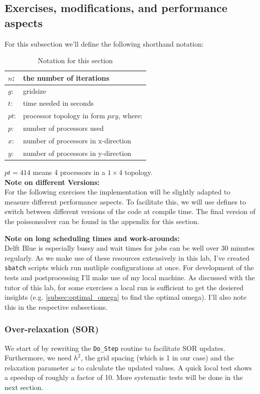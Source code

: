 \subsection{Exercises, modifications, and performance aspects}
For this subsection we'll define the following shorthand notation: \\
\begin{table}[h!]
    \centering
    \begin{tabular}{|l|l|}
        \hline
        $n$:  &the number of iterations\\\hline
        $g$:  &gridsize\\\hline
        $t$:  &time needed in seconds\\\hline
        $pt$: & processor topology in form $pxy$, where:\\
        $p$:  &number of processors used\\
        $x$:  &number of processors in x-direction\\
        $y$:  &number of processors in y-direction\\\hline
       \end{tabular}
    \caption{Notation for this section}
\end{table}
$pt = 414$ means 4 processors in a $1\times 4$ topology. \\

\textbf{Note on different Versions:}\\
For the following exercises the implementation will be slightly adapted to measure different performance aspects. To facilitate this, we will use defines to switch between different versions of the code at compile time. The final version of the poissonsolver can be found in the appendix for this section.

\textbf{Note on long scheduling times and work-arounds:}\\
Delft Blue is especially bussy and wait times for jobs can be well over 30 minutes regularly. As we make use of these resources extensively in this lab, I've created \texttt{sbatch} scripts which run mutliple configurations at once. For development of the tests and postprocessing I'll make use of my local machine. As discussed with the tutor of this lab, for some exercises a local run is sufficient to get the desiered insights (e.g. \autoref{subsec:optimal_omega} to find the optimal omega). I'll also note this in the respective subsections.
\subsubsection{Over-relaxation (SOR)}
We start of by rewriting the \texttt{Do\_Step} routine to facilitate SOR updates. Furthermore, we need $h^2$, the grid spacing (which is 1 in our case) and the relaxation parameter $\omega$ to calculate the updated values. A quick local test shows a speedup of roughly a factor of 10. More systematic tests will be done in the next section.
